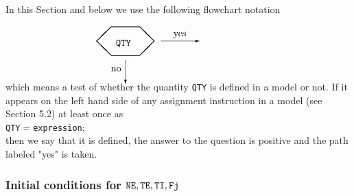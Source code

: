 In this Section and below we use the following flowchart notation
$$
\begin{picture}(110,50)
\put(0,30){\begin{picture}(110,50)
	\thicklines
	\multiput(15,15)(0,-30){2}{\line(1,0){30}}
	\multiput(0,0)(45,-15){2}{\line(1,1){15}}
	\multiput(0,0)(45,15){2}{\line(1,-1){15}}
	\put(20,-5){{\tt QTY}}
	\thinlines
	\put(67,0){\vector(1,0){40}}\put(80,5){yes}
	\put(30,-20){\vector(0,-1){25}}\put(15,-32){no}
	\end{picture}}
\end{picture}\QQUAD
$$
which means a test of whether the quantity {\tt QTY} is defined in a
model or not. 
If it appears on the left hand side of any assignment instruction in 
a model (see Section 5.2) at least once as
\\ \indent
{\tt QTY}$=${\tt expression};\\
then we say that it is defined, the answer to the question is positive 
and the path labeled "yes" is taken.


\subsubsection{Initial conditions for $\tt NE, TE, TI, Fj$}

